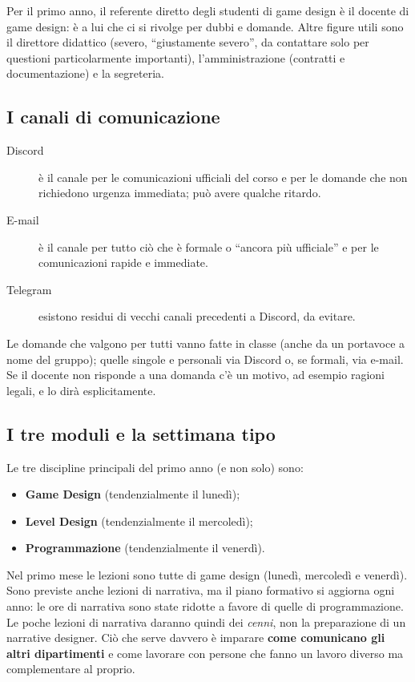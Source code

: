 Per il primo anno, il referente diretto degli studenti di game design è il
docente di game design: è a lui che ci si rivolge per dubbi e domande. Altre
figure utili sono il direttore didattico (severo, ``giustamente severo'', da
contattare solo per questioni particolarmente importanti), l'amministrazione
(contratti e documentazione) e la segreteria.

\subsection{I canali di comunicazione}

\begin{description}
  \item[Discord] è il canale per le comunicazioni ufficiali del corso e per
        le domande che non richiedono urgenza immediata; può avere qualche
        ritardo.
  \item[E-mail] è il canale per tutto ciò che è formale o ``ancora più
        ufficiale'' e per le comunicazioni rapide e immediate.
  \item[Telegram] esistono residui di vecchi canali precedenti a Discord, da
        evitare.
\end{description}

Le domande che valgono per tutti vanno fatte in classe (anche da un portavoce
a nome del gruppo); quelle singole e personali via Discord o, se formali, via
e-mail. Se il docente non risponde a una domanda c'è un motivo, ad esempio
ragioni legali, e lo dirà esplicitamente.

\subsection{I tre moduli e la settimana tipo}

Le tre discipline principali del primo anno (e non solo) sono:
\begin{itemize}
  \item \textbf{Game Design} (tendenzialmente il lunedì);
  \item \textbf{Level Design} (tendenzialmente il mercoledì);
  \item \textbf{Programmazione} (tendenzialmente il venerdì).
\end{itemize}
Nel primo mese le lezioni sono tutte di game design (lunedì, mercoledì e
venerdì). Sono previste anche lezioni di narrativa, ma il piano formativo si
aggiorna ogni anno: le ore di narrativa sono state ridotte a favore di quelle
di programmazione. Le poche lezioni di narrativa daranno quindi dei
\emph{cenni}, non la preparazione di un narrative designer. Ciò che serve
davvero è imparare \textbf{come comunicano gli altri dipartimenti} e come
lavorare con persone che fanno un lavoro diverso ma complementare al proprio.

